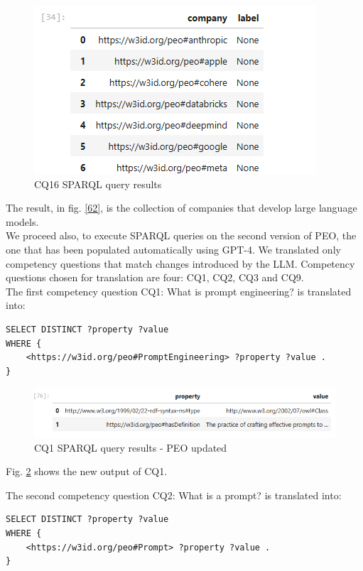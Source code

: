 \begin{figure}[H]
    \centering
    \includegraphics[width=0.8\linewidth]{Figures/fig_62.png}
    \caption{CQ16 SPARQL query results}
    \label{fig:62}
\end{figure}
The result, in fig. \ref{62}, is the collection of companies that develop large language models.\\
We proceed also, to execute SPARQL queries on the second version of PEO, the one that has been populated automatically using GPT-4. 
We translated only competency questions that match changes introduced by the LLM. Competency questions chosen for translation are four: CQ1, CQ2, CQ3 and CQ9.\\
The first competency question CQ1: What is prompt engineering? is translated into:
\begin{lstlisting}
SELECT DISTINCT ?property ?value
WHERE {
    <https://w3id.org/peo#PromptEngineering> ?property ?value .
} 
\end{lstlisting}

\begin{figure}[H]
    \centering
    \includegraphics[width=0.9\linewidth]{Figures/fig_69.png}
    \caption{CQ1 SPARQL query results - PEO updated}
    \label{fig:69}
\end{figure}
Fig. \ref{fig:69} shows the new output of CQ1.

The second competency question CQ2: What is a prompt? is translated
into:
\begin{lstlisting}
SELECT DISTINCT ?property ?value
WHERE {
    <https://w3id.org/peo#Prompt> ?property ?value .
}
\end{lstlisting}

